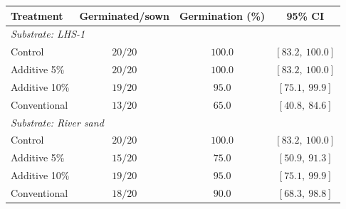 \begin{tabular}{lccc}
\hline\hline
\textbf{Treatment} & \textbf{Germinated/sown} & \textbf{Germination (\%)} & \textbf{95\% CI} \\
\hline
\multicolumn{4}{l}{\textit{Substrate: LHS-1}} \\
Control & $20/20$ & $100.0$ & $[83.2,\ 100.0]$ \\
Additive 5\% & $20/20$ & $100.0$ & $[83.2,\ 100.0]$ \\
Additive 10\% & $19/20$ & $95.0$ & $[75.1,\ 99.9]$ \\
Conventional & $13/20$ & $65.0$ & $[40.8,\ 84.6]$ \\
\hline
\multicolumn{4}{l}{\textit{Substrate: River sand}} \\
Control & $20/20$ & $100.0$ & $[83.2,\ 100.0]$ \\
Additive 5\% & $15/20$ & $75.0$ & $[50.9,\ 91.3]$ \\
Additive 10\% & $19/20$ & $95.0$ & $[75.1,\ 99.9]$ \\
Conventional & $18/20$ & $90.0$ & $[68.3,\ 98.8]$ \\
\hline
\end{tabular}
